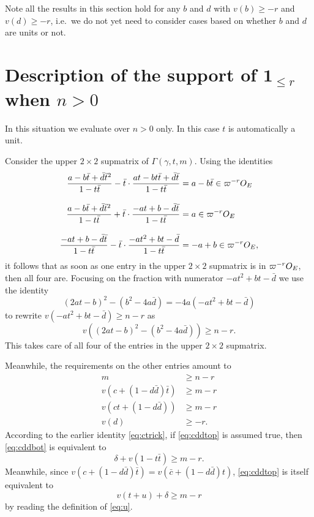 Note all the results in this section hold for any $b$ and $d$
with $v(b) \ge -r$ and $v(d) \ge -r$, i.e.~we do not yet need to consider cases
based on whether $b$ and $d$ are units or not.

\section{Description of the support of $\mathbf{1}_{\le r}$ when $n > 0$}
In this situation we evaluate over $n > 0$ only.
In this case $t$ is automatically a unit.

Consider the upper $2 \times 2$ supmatrix of $\Gamma(\gamma, t, m)$.
Using the identities
\begin{align*}
  \dfrac{a-b\bar t+\bar d \bar t^2}{1-t \bar t}
    - \bar t \cdot \dfrac{at-bt\bar t+\bar d \bar t}{1-t \bar t}
    &= a-b\bar t \in \varpi^{-r} O_E \\[2ex]
  \dfrac{a-b\bar t+\bar d \bar t^2}{1-t \bar t}
    + \bar t \cdot \dfrac{-at+b-\bar d \bar t}{1-t \bar t}
    &= a \in \varpi^{-r} O_E \\[2ex]
  \dfrac{-at+b-\bar d \bar t}{1-t \bar t}
    - \bar t \cdot \dfrac{-at^2+bt-\bar d}{1-t \bar t}
    &= -a+b \in \varpi^{-r} O_E,
\end{align*}
it follows that as soon as one entry in the upper $2 \times 2$
supmatrix is in $\varpi^{-r} O_E$, then all four are.
Focusing on the fraction with numerator $-at^2+bt-\bar d$
we use the identity
\[ (2at-b)^2 - (b^2-4a\bar d) = -4a(-at^2+bt-\bar d) \]
to rewrite $v(-at^2+bt-\bar d) \geq n-r$ as
\[ v\left( (2at-b)^2 - (b^2-4a\bar d) \right) \geq n-r. \]
This takes care of all four of the entries in the upper $2 \times 2$ supmatrix.

Meanwhile, the requirements on the other entries amount to
\begin{align}
  m & \geq n - r \\
  v\left( c+(1-d \bar d) \bar t \right) &\geq m-r \label{eq:cddtop} \\
  v\left( ct+(1-d \bar d) \right) &\geq m-r \label{eq:cddbot} \\
  v(d) &\ge -r \label{eq:vd_ge_minus_r}.
\end{align}
According to the earlier identity \eqref{eq:ctrick}, if \eqref{eq:cddtop} is assumed true,
then \eqref{eq:cddbot} is equivalent to
\[ \delta + v(1-t \bar t) \ge m-r. \]
Meanwhile, since $v(c+(1-d \bar d) \bar t) = v(\bar c + (1-d \bar d)t)$,
\eqref{eq:cddtop} is itself equivalent to
\[ v(t+u) + \delta \geq m-r \]
by reading the definition of \eqref{eq:u}.


